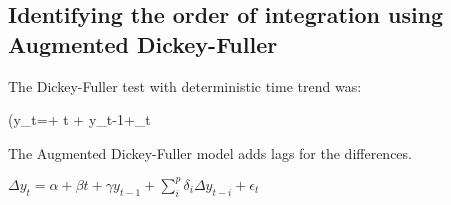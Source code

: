 
\subsection{Identifying the order of integration using Augmented Dickey-Fuller}

The Dickey-Fuller test with deterministic time trend was:

(\Delta y_t=\alpha + \beta t + \gamma y_{t-1}+\epsilon_t \)

The Augmented Dickey-Fuller model adds lags for the differences.

\(\Delta y_t=\alpha + \beta t + \gamma y_{t-1}+\sum_i^p \delta_i \Delta y_{t-i} + \epsilon_t \)

